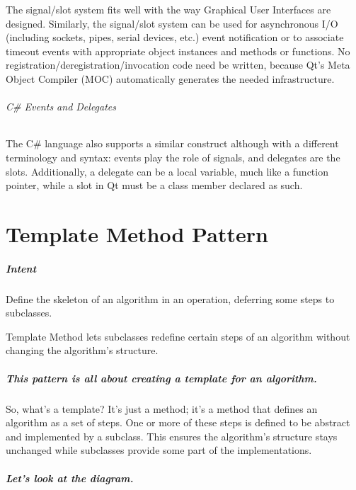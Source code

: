 \documentclass{book}
\begin{document}
    The signal/slot system fits well with the way Graphical User Interfaces are designed.
    Similarly, the signal/slot system can be used for asynchronous I/O (including sockets, pipes, serial devices, etc.) event notification or
    to associate timeout events with appropriate object instances and methods or functions.
    No registration/deregistration/invocation code need be written, because Qt's Meta Object Compiler (MOC) automatically generates the needed infrastructure.
 \subparagraph{C\# Events and Delegates}

The C\# language also supports a similar construct although with a different terminology and syntax: events play the role of signals, and delegates are the slots.
Additionally, a delegate can be a local variable, much like a function pointer, while a slot in Qt must be a class member declared as such.
\chapter{Template Method Pattern}\label{TemplateMethodPattern}

\paragraph{Intent}
Define the skeleton of an algorithm in an operation, deferring some steps to subclasses.

Template Method lets subclasses redefine certain steps of an algorithm without changing the algorithm's structure. 

\paragraph{This pattern is all about creating a template for an algorithm.} So, what's a template?
It's just a method; it's a method that defines an algorithm as a set of steps.
One or more of these steps is defined to be abstract and implemented by a subclass.
This ensures the algorithm's structure stays unchanged while subclasses provide some part of the implementations.

\paragraph{Let's look at the diagram.}

\begin{figure}[H]
\begin{floatrow}
\end{floatrow}
\end{figure}
\end{document}
